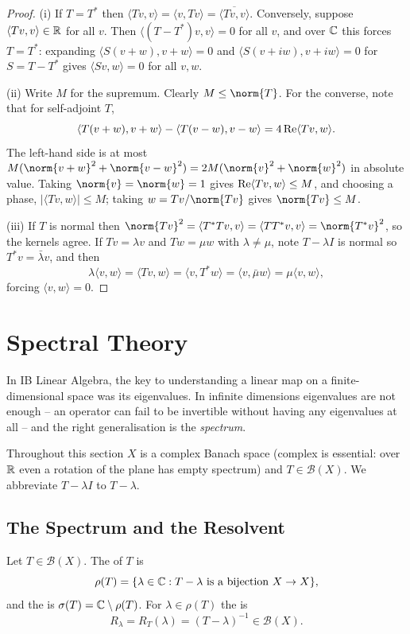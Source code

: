 \documentclass[a4paper]{scrartcl}
\newcommand{\ip}[2]{\langle #1, #2 \rangle}
\newcommand{\Bop}{\mathcal{B}}
\begin{document}
\begin{proof}
	(i) If $T = T^*$ then $\ip{Tv}{v}=\ip{v}{Tv}=\overline{\ip{Tv}{v}}$. Conversely, suppose $\ip{Tv}{v}\in\R$ for all $v$. Then $\ip{(T-T^*)v}{v}=0$ for all $v$, and over $\mathbb{C}$ this forces $T = T^*$: expanding $\ip{S(v+w)}{v+w}=0$ and $\ip{S(v+iw)}{v+iw}=0$ for $S = T-T^*$ gives $\ip{Sv}{w}=0$ for all $v,w$.

	(ii) Write $M$ for the supremum. Clearly $M \leq \norm{T}$. For the converse, note that for self-adjoint $T$,
	$$\ip{T(v+w)}{v+w}-\ip{T(v-w)}{v-w} = 4\re\ip{Tv}{w}.$$
	The left-hand side is at most $M(\norm{v+w}^2+\norm{v-w}^2)=2M(\norm{v}^2+\norm{w}^2)$ in absolute value. Taking $\norm{v}=\norm{w}=1$ gives $\re\ip{Tv}{w}\leq M$, and choosing a phase, $|\ip{Tv}{w}|\leq M$; taking $w = Tv/\norm{Tv}$ gives $\norm{Tv}\leq M$.

	(iii) If $T$ is normal then $\norm{Tv}^2 = \ip{T^*Tv}{v} = \ip{TT^*v}{v} = \norm{T^*v}^2$, so the kernels agree. If $Tv=\lambda v$ and $Tw=\mu w$ with $\lambda \neq \mu$, note $T - \lambda I$ is normal so $T^*v = \bar\lambda v$, and then
	$$\lambda\ip{v}{w} = \ip{Tv}{w}=\ip{v}{T^*w}=\ip{v}{\bar\mu w}=\mu\ip{v}{w},$$
	forcing $\ip{v}{w}=0$.
\end{proof}

\section{Spectral Theory}

In IB Linear Algebra, the key to understanding a linear map on a finite-dimensional space was its eigenvalues. In infinite dimensions eigenvalues are not enough -- an operator can fail to be invertible without having any eigenvalues at all -- and the right generalisation is the \emph{spectrum}.

Throughout this section $X$ is a complex Banach space (complex is essential: over $\mathbb{R}$ even a rotation of the plane has empty spectrum) and $T \in \Bop(X)$. We abbreviate $T - \lambda I$ to $T - \lambda$.

\subsection{The Spectrum and the Resolvent}

\begin{definition}
	Let $T \in \Bop(X)$. The  of $T$ is
	$$\rho(T) = \{ \lambda \in \mathbb{C} : T - \lambda \ \text{is a bijection } X\to X \},$$
	and the  is $\sigma(T) = \mathbb{C} \setminus \rho(T)$. For $\lambda \in \rho(T)$ the  is
	$$R_\lambda = R_T(\lambda) = (T-\lambda)^{-1} \in \Bop(X).$$
\end{definition}
\end{document}
